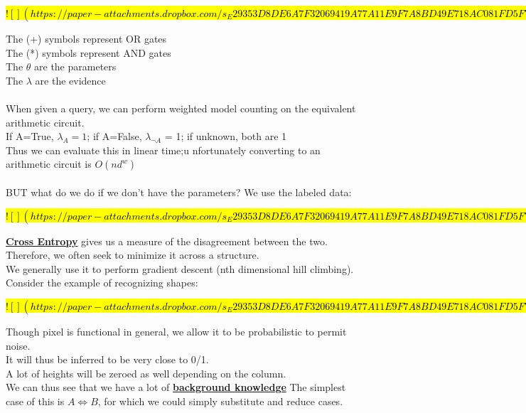 \documentclass[../../lecture_notes.tex]{subfiles}
\begin{document}
\hl{
$![](https://paper-attachments.dropbox.com/s_E29353D8DE6A7F32069419A77A11E9F7A8BD49E718AC081FD5F77701FB86FF68_1590910293904_Screen+Shot+2020-05-31+at+12.30.28+AM.png)$
}

\noindent The (+) symbols represent OR gates\\
The (*) symbols represent AND gates\\
The $\theta$ are the parameters\\
The $\lambda$ are the evidence\\
\\
When given a query, we can perform weighted model counting on the equivalent arithmetic circuit.\\
\indent If A=True, $\lambda_A = 1$; if A=False, $\lambda_{\neg A}$ = 1; if unknown, both are 1\\
Thus we can evaluate this in linear time;u nfortunately converting to an arithmetic circuit is $O(nd^w)$\\
\\
BUT what do we do if we don’t have the parameters?
We use the labeled data:

\hl{
$![](https://paper-attachments.dropbox.com/s_E29353D8DE6A7F32069419A77A11E9F7A8BD49E718AC081FD5F77701FB86FF68_1590911384850_Untitled+drawing+7.jpg)$
}

\noindent \textbf{\underline{Cross Entropy}} gives us a measure of the disagreement between the two.\\
\indent Therefore, we often seek to minimize it across a structure.\\
We generally use it to perform gradient descent (nth dimensional hill climbing).\\
Consider the example of recognizing shapes:

\hl{
$![](https://paper-attachments.dropbox.com/s_E29353D8DE6A7F32069419A77A11E9F7A8BD49E718AC081FD5F77701FB86FF68_1590911957073_Untitled+drawing+8.jpg)$
}

\noindent Though pixel is functional in general, we allow it to be probabilistic to permit noise.\\
It will thus be inferred to be very close to 0/1.\\
A lot of heights will be zeroed as well depending on the column.\\
We can thus see that we have a lot of \textbf{\underline{background knowledge}}
\indent The simplest case of this is $A \iff B$, for which we could simply substitute and reduce cases.
\end{document}
